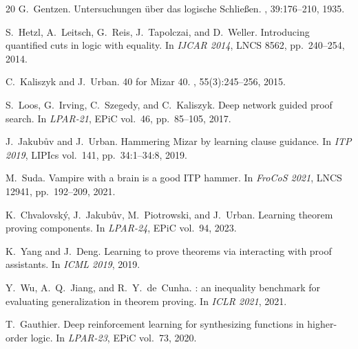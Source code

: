 \documentclass{easychair}
\begin{document}
\begin{thebibliography}{20}
G.~Gentzen.
\newblock Untersuchungen {\"u}ber das logische {S}chlie{\ss}en.
, 39:176--210, 1935.

S.~Hetzl, A.~Leitsch, G.~Reis, J.~Tapolczai, and D.~Weller.
\newblock Introducing quantified cuts in logic with equality.
\newblock In {\em IJCAR 2014}, LNCS 8562, pp.~240--254, 2014.

C.~Kaliszyk and J.~Urban.
 40 for {M}izar 40.
, 55(3):245--256, 2015.

S.~Loos, G.~Irving, C.~Szegedy, and C.~Kaliszyk.
\newblock Deep network guided proof search.
\newblock In {\em LPAR-21}, EPiC vol.~46, pp.~85--105, 2017.

J.~Jakub\r{u}v and J.~Urban.
\newblock Hammering {M}izar by learning clause guidance.
\newblock In {\em ITP 2019}, LIPIcs vol.~141, pp.~34:1--34:8, 2019.

M.~Suda.
\newblock Vampire with a brain is a good {ITP} hammer.
\newblock In {\em FroCoS 2021}, LNCS 12941, pp.~192--209, 2021.

K.~Chvalovsk{\'y}, J.~Jakub\r{u}v, M.~Piotrowski, and J.~Urban.
\newblock Learning theorem proving components.
\newblock In {\em LPAR-24}, EPiC vol.~94, 2023.

K.~Yang and J.~Deng.
\newblock Learning to prove theorems via interacting with proof assistants.
\newblock In {\em ICML 2019}, 2019.

Y.~Wu, A.~Q.~Jiang, and R.~Y.~de~Cunha.
: an inequality benchmark for evaluating generalization in
  theorem proving.
\newblock In {\em ICLR 2021}, 2021.

T.~Gauthier.
\newblock Deep reinforcement learning for synthesizing functions in
  higher-order logic.
\newblock In {\em LPAR-23}, EPiC vol.~73, 2020.

\end{thebibliography}
\end{document}
